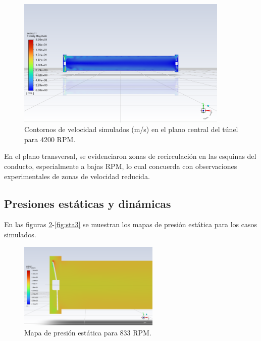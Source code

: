 \pagebreak

\begin{figure}[ht!]
    \centering
    \includegraphics[width=0.9\textwidth]{images/vel3.png}
    \caption{Contornos de velocidad simulados (m/s) en el plano central del túnel para 4200 RPM.}
    \label{fig:vel3}
\end{figure}

En el plano transversal, se evidenciaron zonas de recirculación en las esquinas del conducto, especialmente a bajas RPM, lo cual concuerda con observaciones experimentales de zonas de velocidad reducida.

\pagebreak
\subsection{Presiones estáticas y dinámicas}

En las figuras \ref{fig:sta1}-\ref{fig:sta3} se muestran los mapas de presión estática para los casos simulados.

\begin{figure}[!ht]
    \centering
    \includegraphics[width=0.6\textwidth]{images/sta1.png}
    \caption{Mapa de presión estática para 833 RPM.}
    \label{fig:sta1}
\end{figure}

